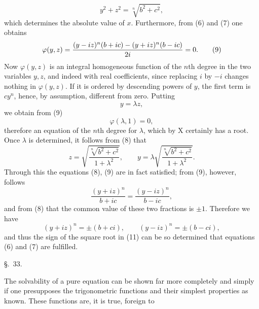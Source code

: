 
\begin{equation}
 y^2+z^2=\sqrt[n]{b^2+c^2},
\tag{8}
\end{equation}
which determines the absolute value of $x$. Furthermore, from (6) and (7) one obtains
\begin{equation}
 \varphi(y,z)={ (y-iz)^n(b+ic)-(y+iz)^n(b-ic) \over 2i}=0.
\tag{9}
\end{equation}
Now $\varphi(y,z)$ is an integral homogeneous function of the $n$th degree in the two variables $y,z$, and indeed with real coefficients, since replacing $i$ by $-i$ changes nothing in $\varphi(y,z)$. If it is ordered by descending powers of $y$, the first term is $cy^n$, hence, by assumption, different from zero. Putting
\[
 y=\lambda z,
\]
we obtain from (9)
\begin{equation}
 \varphi(\lambda,1)=0,
\tag{10}
\end{equation}
therefore an equation of the $n$th degree for $\lambda$, which by X certainly has a root. Once $\lambda$ is determined, it follows from (8) that
\begin{equation}
 z=\sqrt{\frac{\sqrt[n]{b^2+c^2}}{1+\lambda^2}},\qquad
 y=\lambda\sqrt{\frac{\sqrt[n]{b^2+c^2}}{1+\lambda^2}}.
\tag{11}
\end{equation}
Through this the equations (8), (9) are in fact satisfied; from (9), however, follows
\[
 \frac{(y+iz)^n}{b+ic}=\frac{(y-iz)^n}{b-ic},
\]
and from (8) that the common value of these two fractions is $\pm1$. Therefore we have
\[
 (y+iz)^n=\pm(b+ci),\qquad (y-iz)^n=\pm(b-ci),
\]
and thus the sign of the square root in (11) can be so determined that equations (6) and (7) are fulfilled.

\begin{center}
{\large \S.\ 33.}

\vspace{0.5em}
{\large{}}
\end{center}

The solvability of a pure equation can be shown far more completely and simply if one presupposes the trigonometric functions and their simplest properties as known. These functions are, it is true, foreign to
